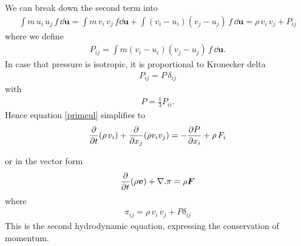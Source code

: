 We can break down the second term into
\begin{align} 
\int m \, u_i \, u_j \, f \, \dd \bm{u} = \int m \, v_i \, v_j \, f \dd \bm{u} + \int (v_i - u_i) (v_j - u_j) \, f \, \dd \bm{u} = \rho \, v_i \, v_j + P_{ij}
\end{align}
where we define 
\begin{align}
P_{ij} = \int m (v_i - u_i) (v_j - u_j) \, f \, \dd \bm{u}.
\end{align}
In case that pressure is isotropic, it is proportional to Kronecker delta
\begin{align}
P_{ij} = P \, \delta_{ij}
\end{align}
with 
\begin{align}
P = \frac{1}{3}P_{ii}.
\end{align}
Hence equation \ref{primeul} simplifies to
\begin{align}
\frac{\partial}{\partial t} (\rho \, v_i) + \frac{\partial }{\partial x_j} (\rho v_i v_j) =  - \frac{\partial P}{\partial x_i}+ \rho \, F_i
\end{align}

or in the vector form
\begin{align}
\frac{\partial }{\partial t} (\rho \bm{v}) + \nabla . \pi = \rho \bm{F}
\end{align}
where
\begin{align}
\pi_{ij} = \rho \, v_i \, v_j + P \delta_{ij}
\end{align}
This is the second hydrodynamic equation, expressing the conservation of momentum.




